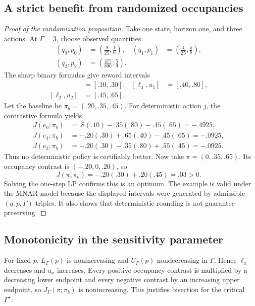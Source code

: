 \documentclass[letterpaper]{article}
\begin{document}
\subsection{A strict benefit from randomized occupancies}
\begin{proof}[Proof of the randomization proposition]
Take one state, horizon one, and three actions. At $\Gamma=3$, choose observed quantities
\begin{align*}
(q_0,p_0)&=\left(\frac9{25},\frac16\right), &
(q_1,p_1)&=\left(\frac4{25},\frac58\right),\\
(q_2,p_2)&=\left(\frac{477}{800},\frac59\right).&&
\end{align*}
The sharp binary formulas give reward intervals
\begin{align*}
[\ell_0,u_0]&=[.10,.30], & [\ell_1,u_1]&=[.40,.80],\\
[\ell_2,u_2]&=[.45,.65].&&
\end{align*}
Let the baseline be $\pi_b=(.20,.35,.45)$. For deterministic action $j$, the contrastive formula yields
\begin{align*}
J(e_0;\pi_b)&=.8(.10)-.35(.80)-.45(.65)=-.4925,\\
J(e_1;\pi_b)&=-.20(.30)+.65(.40)-.45(.65)=-.0925,\\
J(e_2;\pi_b)&=-.20(.30)-.35(.80)+.55(.45)=-.0925.
\end{align*}
Thus no deterministic policy is certifiably better. Now take
$\pi=(0,.35,.65)$. Its occupancy contrast is $(-.20,0,.20)$, so
\[
J(\pi;\pi_b)=-.20(.30)+.20(.45)=.03>0.
\]
Solving the one-step LP confirms this is an optimum. The example is valid under the MNAR model because the displayed intervals were generated by admissible $(q,p,\Gamma)$ triples. It also shows that deterministic rounding is not guarantee preserving.
\end{proof}

\subsection{Monotonicity in the sensitivity parameter}
For fixed $p$, $L_\Gamma(p)$ is nonincreasing and $U_\Gamma(p)$ nondecreasing in $\Gamma$. Hence $\ell_x$ decreases and $u_x$ increases. Every positive occupancy contrast is multiplied by a decreasing lower endpoint and every negative contrast by an increasing upper endpoint, so $J_\Gamma(\pi;\pi_b)$ is nonincreasing. This justifies bisection for the critical $\Gamma^\star$.
\end{document}
